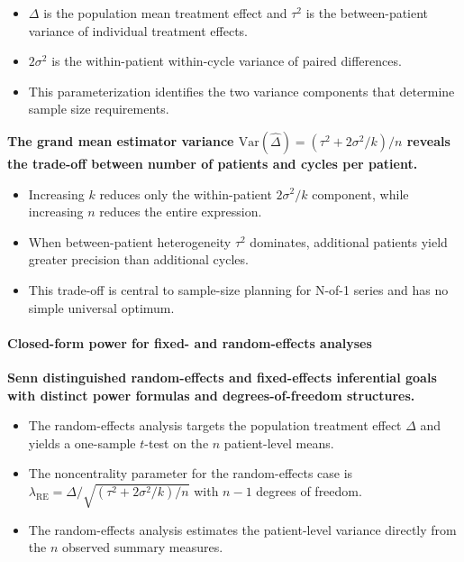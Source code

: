 \documentclass[
  11pt,
]{article}
\begin{document}
\begin{itemize}\setlength{\itemsep}{2pt}\setlength{\parskip}{0pt}
\item $\Delta$ is the population mean treatment effect and $\tau^2$ is the between-patient variance of individual treatment effects.
\item $2\sigma^2$ is the within-patient within-cycle variance of paired differences.
\item This parameterization identifies the two variance components that determine sample size requirements.
\end{itemize}

\textbf{The grand mean estimator variance $\text{Var}(\hat{\Delta}) = (\tau^2 + 2\sigma^2/k)/n$ reveals the trade-off between number of patients and cycles per patient.}

\begin{itemize}\setlength{\itemsep}{2pt}\setlength{\parskip}{0pt}
\item Increasing $k$ reduces only the within-patient $2\sigma^2/k$ component, while increasing $n$ reduces the entire expression.
\item When between-patient heterogeneity $\tau^2$ dominates, additional patients yield greater precision than additional cycles.
\item This trade-off is central to sample-size planning for N-of-1 series and has no simple universal optimum.
\end{itemize}

\paragraph{Closed-form power for fixed- and random-effects analyses}\label{closed-form-power-for-fixed--and-random-effects-analyses}

\textbf{Senn distinguished random-effects and fixed-effects inferential goals with distinct power formulas and degrees-of-freedom structures.}

\begin{itemize}\setlength{\itemsep}{2pt}\setlength{\parskip}{0pt}
\item The random-effects analysis targets the population treatment effect $\Delta$ and yields a one-sample $t$-test on the $n$ patient-level means.
\item The noncentrality parameter for the random-effects case is $\lambda_{\text{RE}} = \Delta / \sqrt{(\tau^2 + 2\sigma^2/k)/n}$ with $n-1$ degrees of freedom.
\item The random-effects analysis estimates the patient-level variance directly from the $n$ observed summary measures.
\end{itemize}
\end{document}

